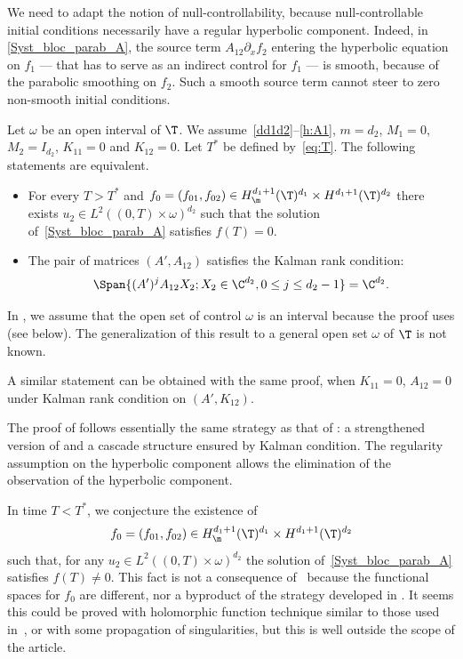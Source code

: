 We need to adapt the notion of null-controllability, because null-controllable initial conditions necessarily have a regular hyperbolic component. Indeed, in \eqref{Syst_bloc_parab_A}, the source term
$A_{12}\partial_x f_2$ entering the hyperbolic equation on $f_1$ --- that has to serve as an indirect control for $f_1$ --- is smooth, because of the parabolic smoothing on $f_2$. Such a smooth source term cannot steer to zero non-smooth initial conditions.

\begin{theorem}\label{th:main_3}
Let $\omega$ be an open interval of $\T$. We assume~\eqref{dd1d2}--\eqref{h:A1}, $m=d_2$, $M_1=0$, $M_2=I_{d_2}$, $K_{11}=0$ and $K_{12}=0$. Let $T^\ast$ be defined by~\eqref{eq:T}.
The following statements are equivalent.
\begin{itemize}
\item For every $T>T^\ast$ and $f_0=(f_{01},f_{02}) \in H^{d_1+1}_\m(\T)^{d_1} \times H^{d_1+1}(\T)^{d_2}$ there exists $u_2 \in L^2((0,T)\times\omega)^{d_2}$ such that the solution of~\eqref{Syst_bloc_parab_A} satisfies $f(T)=0$.
\item The pair of matrices $(A',A_{12})$ satisfies the Kalman rank condition:
\begin{equation} \label{Kalman_Thm3}
\Span \{ (A')^j A_{12} X_2 ; X_2 \in \C^{d_2}, 0 \leq j \leq d_2-1 \} = \C^{d_2}.
\end{equation}
\end{itemize}
\end{theorem}

In , we assume that the open set of control $\omega$ is an interval because the proof uses \cite[Lem.\,2.6]{alabau-boussouira_2017} (see  below). The generalization of this result to a general open set $\omega$ of $\T$ is not known.

A similar statement can be obtained with the same proof, when
$K_{11}=0$, $A_{12}=0$ under Kalman rank condition on $(A',K_{12})$.

The proof of  follows essentially the same strategy as that of : a strengthened version of  and a cascade structure ensured by Kalman condition. The regularity assumption on the hyperbolic component allows the elimination of the observation of the hyperbolic component.

In time $T<T^*$, we conjecture the existence of
\[
f_0=(f_{01},f_{02}) \in H^{d_1+1}_\m(\T)^{d_1} \times H^{d_1+1}(\T)^{d_2}
\]
such that, for any $u_2 \in L^2((0,T)\times\omega)^{d_2}$ the solution of~\eqref{Syst_bloc_parab_A} satisfies $f(T) \neq 0$. This fact is not a consequence of~ because the functional spaces for $f_0$ are different, nor a byproduct of the strategy developed in . It seems this could be proved with holomorphic function technique similar to those used in~\cite{koenig_2017}, or with some propagation of singularities, but this is well outside the scope of the article.


